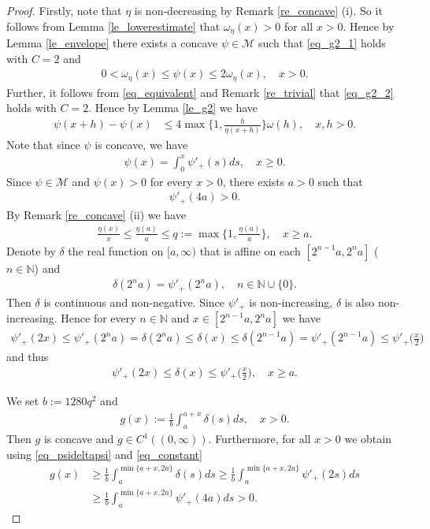 \documentclass[10pt,a4paper]{amsart}
\theoremstyle{definition}
\newcommand{\N}{\mathbb{N}}
\newcommand{\M}{\mathcal{M}}
\begin{document}
\begin{proof}
Firstly, note that $ \eta $ is non-decreasing by Remark \ref{re_concave} (i). So it follows from Lemma \ref{le_lowerestimate} that $ \omega_{\eta}(x)>0 $ for all $ x>0 $. Hence by Lemma \ref{le_envelope} there exists a concave $ \psi\in\M $ such that \eqref{eq_g2_1} holds with $ C=2 $ and 
\begin{align}\label{eq_equivalent}
0<\omega_{\eta}(x)\leq\psi(x)\leq 2\omega_{\eta}(x),\quad x>0.
\end{align}
Further, it follows from \eqref{eq_equivalent} and Remark \ref{re_trivial} that \eqref{eq_g2_2} holds with $ C=2 $. Hence by Lemma \ref{le_g2} we have
\begin{align}\label{eq_uniform}
\psi(x+h)-\psi(x)&\leq 4\max\bigg\lbrace 1,\frac{h}{\eta(x+h)}\bigg\rbrace\omega(h),\quad x,h>0.
\end{align}
Note that since $ \psi $ is concave, we have
\begin{align*}
\psi(x)=\int_{0}^{x}\psi'_+(s)ds,\quad x\geq 0.
\end{align*}
Since $ \psi\in\M $ and $ \psi(x)>0 $ for every $ x>0 $, there exists $ a>0 $ such that
\begin{align}\label{eq_constant}
\psi'_+(4a)>0.
\end{align}
By Remark \ref{re_concave} (ii) we have
\begin{align}\label{eq_defc}
\frac{\eta(x)}{x}\leq\frac{\eta(a)}{a}\leq q:=\max\bigg\lbrace 1,\frac{\eta(a)}{a}\bigg\rbrace,\quad x\geq a.
\end{align}
Denote by $ \delta $ the real function on $ [a,\infty) $ that is affine on each $ [2^{n-1}a,2^na] $ ($ n\in\N $) and 
\begin{align*}
\delta(2^na)=\psi'_+(2^na),\quad n\in\N\cup\lbrace 0\rbrace.
\end{align*}
Then $ \delta $ is continuous and non-negative. Since $ \psi'_+ $ is non-increasing, $ \delta $ is also non-increasing. Hence for every $ n\in\N $ and $ x\in [2^{n-1}a,2^na] $ we have
\begin{align*}
\psi'_+(2x)\leq\psi'_+(2^na)=\delta(2^na)\leq\delta(x)\leq\delta(2^{n-1}a)=\psi'_+(2^{n-1}a)\leq\psi'_+\bigg(\frac{x}{2}\bigg)
\end{align*}
and thus
\begin{align}\label{eq_psideltapsi}
\psi'_+(2x)\leq\delta(x)\leq\psi'_+\bigg(\frac{x}{2}\bigg),\quad x\geq a.
\end{align}

We set $ b:=1280q^2 $ and
\begin{align*}
g(x):=\frac{1}{b}\int_{a}^{a+x}\delta(s)ds,\quad x>0.
\end{align*}
Then $ g $ is concave and $ g\in C^1((0,\infty)) $. Furthermore, for all $ x>0 $ we obtain using \eqref{eq_psideltapsi} and \eqref{eq_constant} 
\begin{align*}
g(x)&\geq\frac{1}{b}\int_{a}^{\min\lbrace a+x,2a\rbrace}\delta(s)ds\geq\frac{1}{b}\int_{a}^{\min\lbrace a+x,2a\rbrace}\psi'_+(2s)ds\\
&\geq\frac{1}{b}\int_{a}^{\min\lbrace a+x,2a\rbrace}\psi'_+(4a)ds>0.
\end{align*}



\end{proof}
\end{document}
